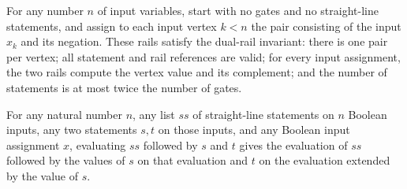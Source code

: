 \begin{theorem}
\label{BoolCircuit.StraightLine.dualInv_nil}
\leanok
{}
For any number $n$ of input variables, start with no gates and no straight-line
statements, and assign to each input vertex $k<n$ the pair consisting of the input $x_k$
and its negation. These rails satisfy the dual-rail invariant: there is one pair per
vertex; all statement and rail references are valid; for every input assignment, the two
rails compute the vertex value and its complement; and the number of statements is at
most twice the number of gates.
\end{theorem}

\begin{theorem}
\label{BoolCircuit.StraightLine.runLines_two}
\leanok
{}
For any natural number $n$, any list $ss$ of straight-line statements on $n$ Boolean
inputs, any two statements $s,t$ on those inputs, and any Boolean input assignment $x$,
evaluating $ss$ followed by $s$ and $t$ gives the evaluation of $ss$ followed by the
values of $s$ on that evaluation and $t$ on the evaluation extended by the value of $s$.
\end{theorem}

